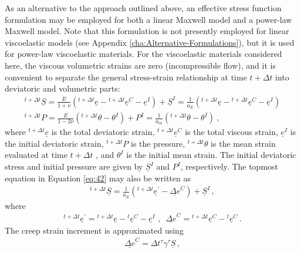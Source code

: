 As an alternative to the approach outlined above, an effective stress
function formulation \cite{Kojic:Bathe:1987} may be employed for
both a linear Maxwell model and a power-law Maxwell model. Note that
this formulation is not presently employed for linear viscoelastic
models (see Appendix \ref{cha:Alternative-Formulations}), but it
is used for power-law viscoelastic materials. For the viscoelastic
materials considered here, the viscous volumetric strains are zero
(incompressible flow), and it is convenient to separate the general
stress-strain relationship at time $t+\Delta t$ into deviatoric and
volumetric parts:
\begin{gather}
\phantom{}{}^{t+\Delta t}\underline{S}=\frac{E}{1+\nu}\left(^{t+\Delta t}\underline{e}-\phantom{}^{t+\Delta t}\underline{e}^{C}-\underline{e}^{I}\right)+\underline{S}^{I}=\frac{1}{a_{E}}\left(^{t+\Delta t}\underline{e}-\phantom{}^{t+\Delta t}\underline{e}^{C}-\underline{e}^{I}\right)\label{eq:42}\\
^{t+\Delta t}P=\frac{E}{1-2\nu}\left(^{t+\Delta t}\theta-\theta^{I}\right)+P^{I}=\frac{1}{a_{m}}\left(^{t+\Delta t}\theta-\theta^{I}\right)\:,\nonumber 
\end{gather}
where $^{t+\Delta t}\underline{e}$ is the total deviatoric strain,
$^{t+\Delta t}\underline{e}^{C}$ is the total viscous strain, $\underline{e}^{I}$
is the initial deviatoric strain, $^{t+\Delta t}P$ is the pressure,
$^{t+\Delta t}\theta$ is the mean strain evaluated at time $t+\Delta t$
, and $\theta^{I}$ is the initial mean strain. The initial deviatoric
stress and initial pressure are given by $\underline{S}^{I}$ and
$P^{I}$, respectively. The topmost equation in Equation \ref{eq:42}
may also be written as
\begin{gather}
^{t+\Delta t}\underline{S}=\frac{1}{a_{E}}(^{t+\Delta t}\underline{e}^{\prime}-\underline{\Delta e}^{C})+\underline{S}^{I}\,,\label{eq:43}
\end{gather}
where
\begin{gather}
^{t+\Delta t}\underline{e}^{\prime}=\phantom{}^{t+\Delta t}\underline{e}-\phantom{}^{t}\underline{e}^{C}-\underline{e}^{I}\,\,,\,\,\,\underline{\Delta e}^{C}=\phantom{}^{t+\Delta t}\underline{e}^{C}-\phantom{}^{t}\underline{e}^{C}\,.\label{eq:44}
\end{gather}
The creep strain increment is approximated using
\begin{gather}
\underline{\Delta e}^{C}=\Delta t\phantom{}^{\tau}\gamma\phantom{}^{\tau}\underline{S}\,,\label{eq:45}
\end{gather}
